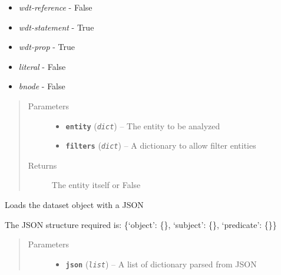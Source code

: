 \documentclass[letterpaper,10pt,english]{sphinxmanual}
\begin{document}
\begin{fulllineitems}
\begin{fulllineitems}
\begin{itemize}
\item {} 
\emph{wdt-reference} - False

\item {} 
\emph{wdt-statement} - True

\item {} 
\emph{wdt-prop} - True

\item {} 
\emph{literal} - False

\item {} 
\emph{bnode} - False

\end{itemize}
\begin{quote}\begin{description}
\item[{Parameters}] \leavevmode\begin{itemize}
\item {} 
\textbf{\texttt{entity}} (\emph{\texttt{dict}}) -- The entity to be analyzed

\item {} 
\textbf{\texttt{filters}} (\emph{\texttt{dict}}) -- A dictionary to allow filter entities

\end{itemize}

\item[{Returns}] \leavevmode
The entity itself or False

\end{description}\end{quote}

\end{fulllineitems}


\begin{fulllineitems}
\label{index:dataset.Dataset.load_dataset_from_json}
Loads the dataset object with a JSON

The JSON structure required is:
\{`object': \{\}, `subject': \{\}, `predicate': \{\}\}
\begin{quote}\begin{description}
\item[{Parameters}] \leavevmode\begin{itemize}
\item {} 
\textbf{\texttt{json}} (\emph{\texttt{list}}) -- A list of dictionary parsed from JSON


\end{itemize}
\end{description}
\end{quote}
\end{fulllineitems}
\end{fulllineitems}
\end{document}
